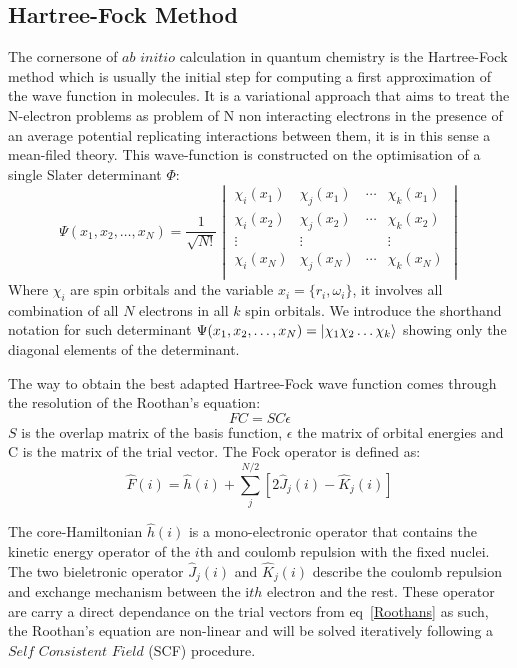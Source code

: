 \documentclass[12pt]{article}
\numberwithin{equation}{section}
\begin{document}
\subsection{Hartree-Fock Method}
The cornersone of $ab$ $initio$ calculation in quantum chemistry is the Hartree-Fock method which is usually the initial step for computing a first approximation of the wave function in molecules. 
It is a variational approach that aims to treat the N-electron problems as problem of N non interacting electrons in the presence of an average potential replicating interactions between them, it is in this sense a mean-filed theory.
This wave-function is constructed on the optimisation of a single Slater determinant $\Phi$:
\begin{equation}
    \Psi(x_1,x_2,\ldots,x_N)=\frac{1}{\sqrt{N!}}
    \begin{vmatrix}
        \chi_i (x_1) & \chi_j (x_1) & \cdots & \chi_k (x_1)\\
        \chi_i (x_2) & \chi_j (x_2) & \cdots & \chi_k (x_2)\\
        \vdots & \vdots &   &  \vdots\\
        \chi_i (x_N) & \chi_j (x_N) & \cdots & \chi_k (x_N)\\
    \end{vmatrix}
\end{equation}
Where $\chi_i$ are spin orbitals and the variable $x_i=\{r_i,\omega_i\}$, it involves all combination of all $N$ electrons in all $k$ spin orbitals. 
We introduce the shorthand notation for such determinant $\Psi(x_1,x_2,\ldots,x_N)=\ket{\chi_1\chi_2\ldots\chi_k}$ showing only the diagonal elements of the determinant.

The way to obtain the best adapted Hartree-Fock wave function comes through the resolution of the Roothan's equation:
\begin{equation}\label{Roothans}
    FC=SC\epsilon
\end{equation}
$S$ is the overlap matrix of the basis function, $\epsilon$ the matrix of orbital energies and C is the matrix of the trial vector.
The Fock operator is defined as:
\begin{equation}
    \hat{F}(i)=\hat{h}(i)+\sum_{j}^{N/2}[2\hat{J}_{j}(i)-\hat{K}_{j}(i)]
\end{equation}

The core-Hamiltonian $\hat{h}(i)$ is a mono-electronic operator that contains the kinetic energy operator of the $i$th and coulomb repulsion with the fixed nuclei. 
The two bieletronic operator $\hat{J}_{j}(i)$ and $\hat{K}_{j}(i)$ describe the coulomb repulsion and exchange mechanism between the i$th$ electron and the rest.
These operator are carry a direct dependance on the trial vectors from eq~\ref{Roothans} as such, the Roothan's equation are non-linear and will be solved iteratively following a $Self$ $Consistent$ $Field$ (SCF) procedure.
\end{document}
